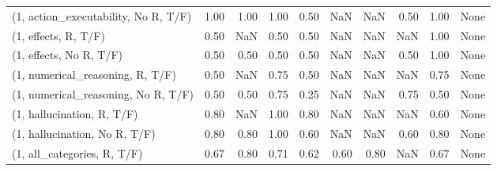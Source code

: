 \begin{table*}[h!]
\begin{adjustbox}{width=2\columnwidth,center}
\begin{tabular}{lrrr|rrr|rrr}
(1, action\_executability, No R, T/F) &                      1.00 &                  1.00 &                      1.00 &                          0.50 &                       NaN &                           NaN &                                   0.50 &                               1.00 &                                  None \\
(1, effects, R, T/F)                 &                      0.50 &                   NaN &                      0.50 &                          0.50 &                       NaN &                           NaN &                                    NaN &                               1.00 &                                  None \\
(1, effects, No R, T/F)              &                      0.50 &                  0.50 &                      0.50 &                          0.50 &                       NaN &                           NaN &                                   0.50 &                               1.00 &                                  None \\
(1, numerical\_reasoning, R, T/F)     &                      0.50 &                   NaN &                      0.75 &                          0.50 &                       NaN &                           NaN &                                    NaN &                               0.75 &                                  None \\
(1, numerical\_reasoning, No R, T/F)  &                      0.50 &                  0.50 &                      0.75 &                          0.25 &                       NaN &                           NaN &                                   0.75 &                               0.50 &                                  None \\
(1, hallucination, R, T/F)           &                      0.80 &                   NaN &                      1.00 &                          0.80 &                       NaN &                           NaN &                                    NaN &                               0.60 &                                  None \\
(1, hallucination, No R, T/F)        &                      0.80 &                  0.80 &                      1.00 &                          0.60 &                       NaN &                           NaN &                                   0.60 &                               0.80 &                                  None \\
(1, all\_categories, R, T/F)          &                      0.67 &                  0.80 &                      0.71 &                          0.62 &                      0.60 &                          0.80 &                                    NaN &                               0.67 &                                  None \\

\end{tabular}
\end{adjustbox}
\end{table*}
